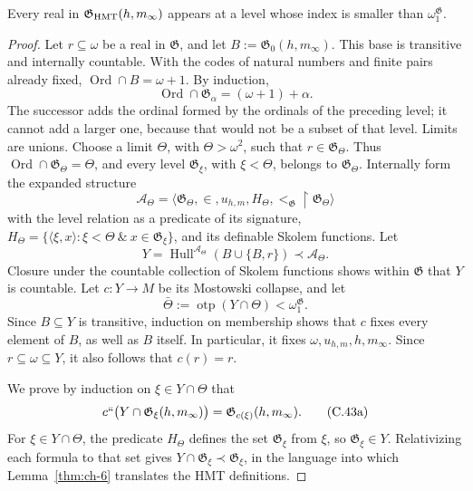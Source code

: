 \begin{lemma}
\label{thm:ch-8}
Every real in \(\mathfrak G_{\rm HMT}(h,m_\infty)\) appears at a level whose
index is smaller than \(\omega_1^{\mathfrak G}\).

\end{lemma}
\begin{proof}
Let \(r\subseteq\omega\) be a real in \(\mathfrak G\), and let
\(B:=\mathfrak G_0(h,m_\infty)\). This base is transitive and internally
countable. With the codes of natural numbers and finite pairs already fixed,
\(\operatorname{Ord}\cap B=\omega+1\). By induction,
\[
 \operatorname{Ord}\cap\mathfrak G_\alpha=(\omega+1)+\alpha.
\]
The successor adds the ordinal formed by the ordinals of the preceding level;
it cannot add a larger one, because that would not be a subset of that level.
Limits are unions. Choose a limit \(\Theta\), with \(\Theta>\omega^2\), such
that \(r\in\mathfrak G_\Theta\). Thus
\(\operatorname{Ord}\cap\mathfrak G_\Theta=\Theta\), and every level
\(\mathfrak G_\xi\), with \(\xi<\Theta\), belongs to
\(\mathfrak G_\Theta\). Internally form the expanded structure
\[
 \mathcal A_\Theta=
 \langle\mathfrak G_\Theta,\in,u_{h,m},
         H_\Theta,<_{\mathfrak G}\!\upharpoonright\mathfrak G_\Theta\rangle
\]
with the level relation as a predicate of its signature,
\(H_\Theta=\{\langle\xi,x\rangle:\xi<\Theta\ \&\
x\in\mathfrak G_\xi\}\), and its definable Skolem functions. Let
\[
 Y=\operatorname{Hull}^{\mathcal A_\Theta}
   (B\cup\{B,r\})\prec\mathcal A_\Theta .
\]
Closure under the countable collection of Skolem functions shows within
\(\mathfrak G\) that \(Y\) is countable. Let \(c:Y\rightarrow M\) be its
Mostowski collapse, and let
\[
 \bar\Theta:=\operatorname{otp}(Y\cap\Theta)
 <\omega_1^{\mathfrak G}.
\]
Since \(B\subseteq Y\) is transitive, induction on membership shows that
\(c\) fixes every element of \(B\), as well as \(B\) itself. In particular,
it fixes \(\omega,u_{h,m},h,m_\infty\). Since
\(r\subseteq\omega\subseteq Y\), it also follows that \(c(r)=r\).

We prove by induction on \(\xi\in Y\cap\Theta\) that
\[
 c``\bigl(Y\cap\mathfrak G_\xi(h,m_\infty)\bigr)
 =\mathfrak G_{c(\xi)}(h,m_\infty).
\tag{C.43a}\label{eq:ch-condensacion}
\]
For \(\xi\in Y\cap\Theta\), the predicate \(H_\Theta\) defines the set
\(\mathfrak G_\xi\) from \(\xi\), so \(\mathfrak G_\xi\in Y\).
Relativizing each formula to that set gives
\(Y\cap\mathfrak G_\xi\prec\mathfrak G_\xi\), in the language into which
Lemma~\ref{thm:ch-6} translates the HMT definitions.


\end{proof}
